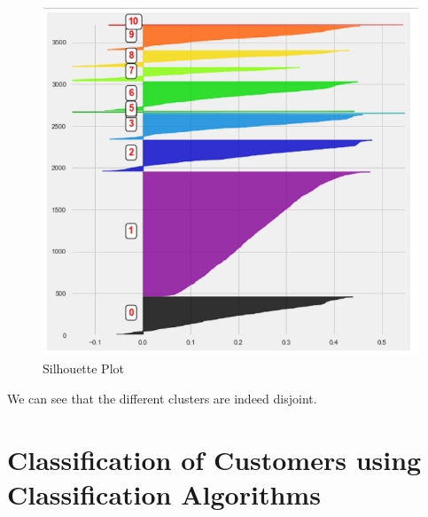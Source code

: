 \begin{figure}[H]
\caption{Silhouette Plot}
\label{4.5}
\centering
\includegraphics[width=\columnwidth]{images/4_5.PNG}
\end{figure}

We can see that the different clusters are indeed disjoint.

\section{Classification of Customers using Classification Algorithms}

